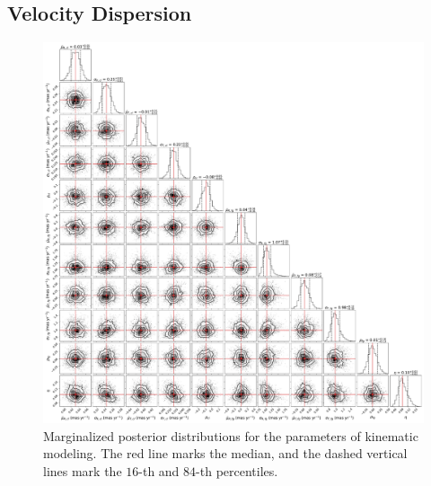 \documentclass[12pt]{ucsddissertation}
\begin{document}
\begin{CJK*}{UTF8}{gbsn}
\subsection{Velocity Dispersion}
\label{wd1-subsec:vdisp_result}

\begin{figure}[htb!]
    \centering
    \includegraphics[width = \linewidth]{figures/chapter2/vdisp_corner.pdf}
    \caption[Posterior distributions of kinematics modeling]{Marginalized posterior distributions for the parameters of kinematic modeling. The red line marks the median, and the dashed vertical lines mark the $16$-th and $84$-th percentiles.}
    \label{fig:vdisp_corner}
\end{figure}


\end{CJK*}
\end{document}
